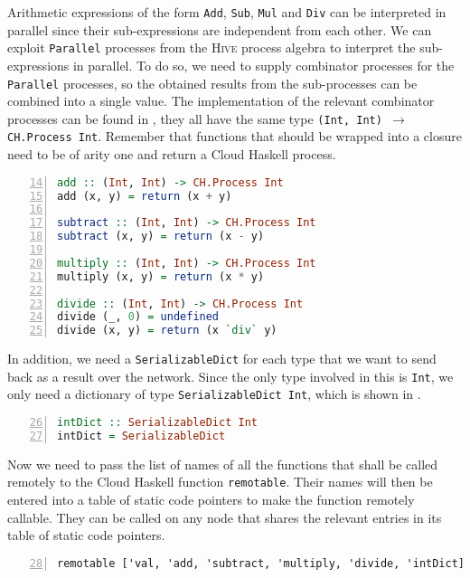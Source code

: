 Arithmetic expressions of the form \texttt{Add}, \texttt{Sub}, \texttt{Mul} and \texttt{Div} can be interpreted in parallel since their sub-expressions are independent from each other. We can exploit \texttt{Parallel} processes from the \textsc{Hive} process algebra to interpret the sub-expressions in parallel. To do so, we need to supply combinator processes for the \texttt{Parallel} processes, so the obtained results from the sub-processes can be combined into a single value. The implementation of the relevant combinator processes can be found in , they all have the same type \texttt{(Int, Int) $\to$ CH.Process Int}. Remember that functions that should be wrapped into a closure need to be of arity one and return a \textsf{Cloud Haskell} process.
\begin{lstlisting}[language=Haskell, caption=\textsf{Cloud Haskell} processes for the combination of results from processes that have been executed in parallel., label=lst:arith_combinators,numbers=left, frame=bt, firstnumber=14]
add :: (Int, Int) -> CH.Process Int
add (x, y) = return (x + y)

subtract :: (Int, Int) -> CH.Process Int
subtract (x, y) = return (x - y)

multiply :: (Int, Int) -> CH.Process Int
multiply (x, y) = return (x * y)

divide :: (Int, Int) -> CH.Process Int
divide (_, 0) = undefined
divide (x, y) = return (x `div` y)
\end{lstlisting}

In addition, we need a \texttt{SerializableDict} for each type that we want to send back as a result over the network. Since the only type involved in this is \texttt{Int}, we only need a dictionary of type \texttt{SerializableDict Int}, which is shown in .
\begin{lstlisting}[language=Haskell, caption=\texttt{SerializableDict} for values of type \texttt{Int}., label=lst:arith_dict, numbers=left, frame=bt, firstnumber=26]
intDict :: SerializableDict Int
intDict = SerializableDict
\end{lstlisting}

Now we need to pass the list of names of all the functions that shall be called remotely to the \textsf{Cloud Haskell} function \texttt{remotable}. Their names will then be entered into a table of static code pointers to make the function remotely callable. They can be called on any node that shares the relevant entries in its table of static code pointers.
\begin{lstlisting}[language=Haskell, caption=Making functions remotely callable., label=lst:arith_remotable, numbers=left, frame=bt, firstnumber=28]
remotable ['val, 'add, 'subtract, 'multiply, 'divide, 'intDict]
\end{lstlisting}

